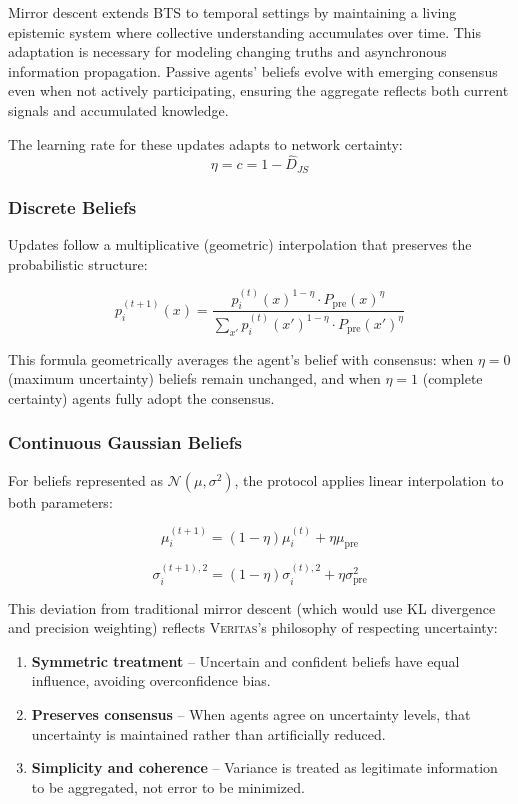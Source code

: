 \documentclass[11pt,a4paper]{article}
\newcommand{\veritas}{\textsc{Veritas}}
\begin{document}
Mirror descent extends BTS to temporal settings by maintaining a living epistemic system where collective understanding accumulates over time. This adaptation is necessary for modeling changing truths and asynchronous information propagation. Passive agents' beliefs evolve with emerging consensus even when not actively participating, ensuring the aggregate reflects both current signals and accumulated knowledge.

The learning rate for these updates adapts to network certainty:
$$\eta = c = 1 - \hat{D}_{JS}$$

\subsubsection*{Discrete Beliefs}

Updates follow a multiplicative (geometric) interpolation that preserves the probabilistic structure:

$$p_i^{(t+1)}(x) = \frac{p_i^{(t)}(x)^{1-\eta} \cdot P_{\text{pre}}(x)^{\eta}}{\sum_{x'} p_i^{(t)}(x')^{1-\eta} \cdot P_{\text{pre}}(x')^{\eta}}$$

This formula geometrically averages the agent's belief with consensus: when $\eta = 0$ (maximum uncertainty) beliefs remain unchanged, and when $\eta = 1$ (complete certainty) agents fully adopt the consensus.

\subsubsection*{Continuous Gaussian Beliefs}

For beliefs represented as $\mathcal{N}(\mu, \sigma^2)$, the protocol applies linear interpolation to both parameters:

$$\mu_i^{(t+1)} = (1-\eta)\mu_i^{(t)} + \eta\mu_{\text{pre}}$$

$$\sigma_i^{(t+1),2} = (1-\eta)\sigma_i^{(t),2} + \eta\sigma_{\text{pre}}^2$$

This deviation from traditional mirror descent (which would use KL divergence and precision weighting) reflects \veritas{}'s philosophy of respecting uncertainty:

\begin{enumerate}
\item \textbf{Symmetric treatment} – Uncertain and confident beliefs have equal influence, avoiding overconfidence bias.

\item \textbf{Preserves consensus} – When agents agree on uncertainty levels, that uncertainty is maintained rather than artificially reduced.

\item \textbf{Simplicity and coherence} – Variance is treated as legitimate information to be aggregated, not error to be minimized.
\end{enumerate}
\end{document}
